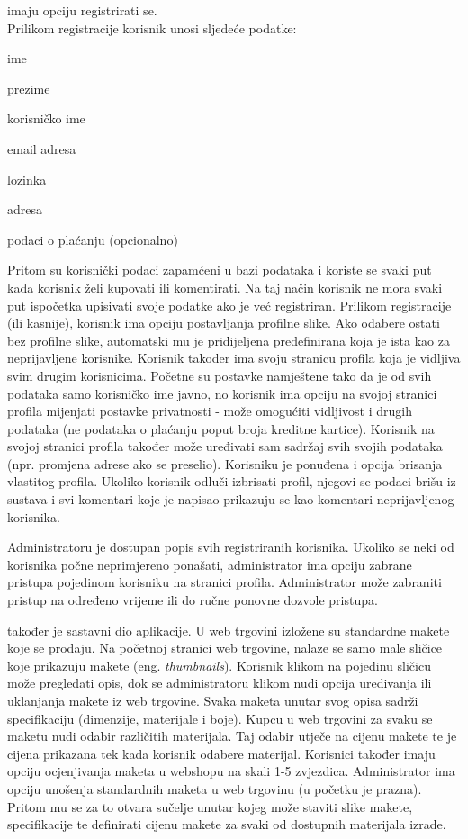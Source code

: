 		 imaju opciju registrirati se. \\Prilikom registracije korisnik unosi sljedeće podatke:
		\begin{packed_item}
			
			\item  ime
			\item  prezime
			\item  korisničko ime
			\item  email adresa
			\item  lozinka
			\item  adresa
			\item  podaci o plaćanju (opcionalno)
			
		\end{packed_item}
		 Pritom su korisnički podaci zapamćeni u bazi podataka i koriste se svaki put kada korisnik želi kupovati ili komentirati. Na taj način korisnik ne mora svaki put ispočetka upisivati svoje podatke ako je već registriran. Prilikom registracije (ili kasnije), korisnik ima opciju postavljanja profilne slike. Ako odabere ostati bez profilne slike, automatski mu je pridijeljena predefinirana koja je ista kao za neprijavljene korisnike. Korisnik također ima svoju stranicu profila koja je vidljiva svim drugim korisnicima. Početne su postavke namještene tako da je od svih podataka samo korisničko ime javno, no korisnik ima opciju na svojoj stranici profila mijenjati postavke privatnosti - može omogućiti vidljivost i drugih podataka (ne podataka o plaćanju poput broja kreditne kartice). Korisnik na svojoj stranici profila također može uređivati sam sadržaj svih svojih podataka (npr. promjena adrese ako se preselio). Korisniku je ponuđena i opcija brisanja vlastitog profila. Ukoliko korisnik odluči izbrisati profil, njegovi se podaci brišu iz sustava i svi komentari koje je napisao prikazuju se kao komentari neprijavljenog korisnika.
		 
		 Administratoru je dostupan popis svih registriranih korisnika. Ukoliko se neki od korisnika počne neprimjereno ponašati, administrator ima opciju zabrane pristupa pojedinom korisniku na stranici profila. Administrator može zabraniti pristup na određeno vrijeme ili do ručne ponovne dozvole pristupa. 
		
		 također je sastavni dio aplikacije. U web trgovini izložene su standardne makete koje se prodaju. Na početnoj stranici web trgovine, nalaze se samo male sličice koje prikazuju makete (eng. \textit{thumbnails}). Korisnik klikom na pojedinu sličicu može pregledati opis, dok se administratoru klikom nudi opcija uređivanja ili uklanjanja makete iz web trgovine. Svaka maketa unutar svog opisa sadrži specifikaciju (dimenzije, materijale i boje). Kupcu u web trgovini za svaku se maketu nudi odabir različitih materijala. Taj odabir utječe na cijenu makete te je cijena prikazana tek kada korisnik odabere materijal. Korisnici također imaju opciju ocjenjivanja maketa u webshopu na skali 1-5 zvjezdica. Administrator ima opciju unošenja standardnih maketa u web trgovinu (u početku je prazna). Pritom mu se za to otvara sučelje unutar kojeg može staviti slike makete, specifikacije te definirati cijenu makete za svaki od dostupnih materijala izrade.
		
